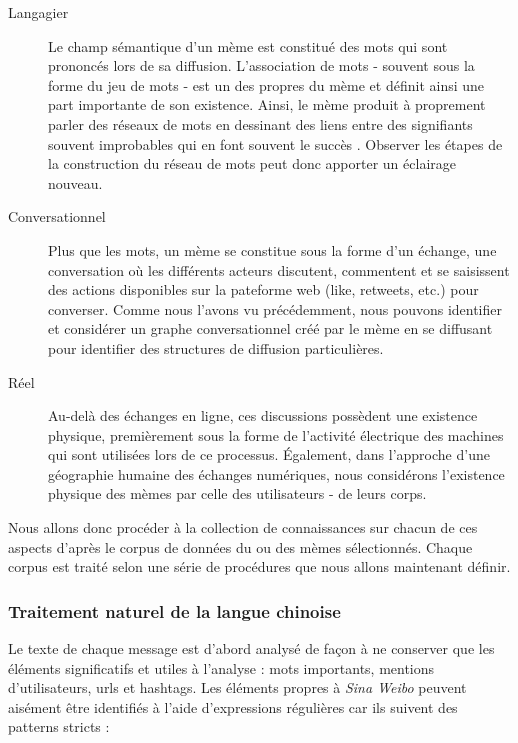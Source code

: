     \begin{description}
        \item[Langagier]
        Le champ sémantique d{\textquoteright}un mème est constitué des mots qui sont prononcés lors de sa diffusion. L{\textquoteright}association de mots - souvent sous la forme du jeu de mots - est un des propres du mème et définit ainsi une part importante de son existence. Ainsi, le mème produit à proprement parler des réseaux de mots en dessinant des liens entre des signifiants souvent improbables qui en font souvent le succès \citep{Bauckhage2011}. Observer les étapes de la construction du réseau de mots peut donc apporter un éclairage nouveau.

        \item[Conversationnel] 
        Plus que les mots, un mème se constitue sous la forme d{\textquoteright}un échange, une conversation o\`u les différents acteurs discutent, commentent et se saisissent des actions disponibles sur la pateforme web (like, retweets, etc.) pour converser. Comme nous l{\textquoteright}avons vu précédemment, nous pouvons identifier et considérer un graphe conversationnel créé par le mème en se diffusant pour identifier des structures de diffusion particulières. 

        \item[Réel] 
        Au-delà des échanges en ligne, ces discussions possèdent une existence physique, premièrement sous la forme de l{\textquoteright}activité électrique des machines qui sont utilisées lors de ce processus. \'Egalement, dans l{\textquoteright}approche d{\textquoteright}une géographie humaine des échanges numériques, nous considérons l{\textquoteright}existence physique des mèmes par celle des utilisateurs - de leurs corps. 
    \end{description}

    Nous allons donc procéder à la collection de connaissances sur chacun de ces aspects d'après le corpus de données du ou des mèmes sélectionnés. Chaque corpus est traité selon une série de procédures que nous allons maintenant définir. 

\subsubsection[Traitement naturel de la langue chinoise]{Traitement naturel de la langue chinoise}

    Le texte de chaque message est d'abord analysé de fa\c{c}on à ne conserver que les éléments significatifs et utiles à l'analyse : mots importants, mentions d'utilisateurs, urls et hashtags. Les éléments propres à \textit{Sina Weibo} peuvent aisément être identifiés à l'aide d'expressions régulières car ils suivent des patterns stricts : 

